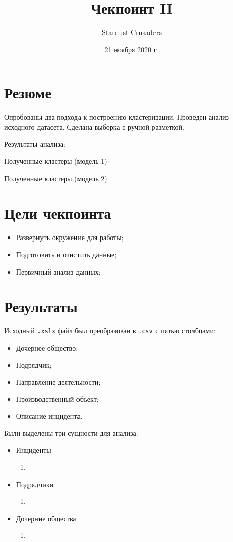 \documentclass{article}
\title{Чекпоинт II}
\author{Stardust Crusaders}
\date{21 ноября 2020 г.}
\begin{document}
\maketitle
\tableofcontents

\section*{Резюме}
Опробованы два подхода к построению кластеризации. Проведен анализ исходного датасета. Сделана выборка с ручной разметкой.

Результаты анализа:

Полученные кластеры (модель 1)

Полученные кластеры (модель 2)

\newpage
\section{Цели чекпоинта}
\begin{itemize}
    \item Развернуть окружение для работы;
    \item Подготовить и очистить данные;
    \item Первичный анализ данных;
\end{itemize}


\section{Результаты}
Исходный \texttt{.xslx} файл был преобразован в \texttt{.csv} с пятью столбцами: 
\begin{itemize}
    \item Дочернее общество:
    \item Подрядчик; 
    \item Направление деятельности;
    \item Производственный объект;
    \item Описание инцидента.
\end{itemize}

Были выделены три сущности для анализа:
\begin{itemize}
    \item Инциденты
    \begin{enumerate}[label=(\arabic*)]
        \item 
    \end{enumerate}
    \item Подрядчики
    \begin{enumerate}[label=(\arabic*)]
        \item 
    \end{enumerate}
    \item Дочерние общества
    \begin{enumerate}[label=(\arabic*)]
        \item 
    \end{enumerate}
\end{itemize}
\end{document}
